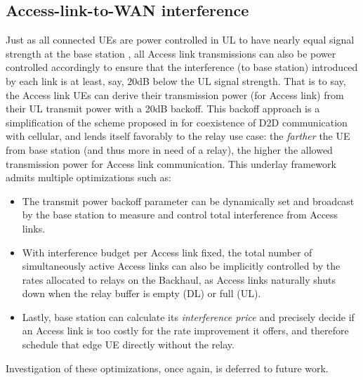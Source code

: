 \documentclass[journal]{IEEEtran}
\begin{document}



\subsection{Access-link-to-WAN interference}
Just as all connected UEs are power controlled in UL to have nearly equal signal strength at the base station \cite[pp.~464-471]{SesTouBak09}, all Access link transmissions can also be power controlled accordingly to ensure that the interference (to base station) introduced by each link is at least, say, $20$dB below the UL signal strength.   That is to say, the Access link UEs can derive their transmission power (for Access link) from their UL transmit power with a 20dB backoff.  This backoff approach is a simplification of the scheme proposed in \cite{JanisYuDoppler09} for coexistence of D2D communication with cellular, and lends itself favorably to the relay use case: the {\em farther} the UE from base station (and thus more in need of a relay), the higher the allowed transmission power for Access link communication.  This underlay framework admits multiple optimizations such as:
\begin{itemize}
    \item The transmit power backoff parameter can be dynamically set and broadcast by the base station to measure and control total interference from Access links.
    \item With interference budget per Access link fixed, the total number of simultaneously active Access links can also be implicitly controlled by the rates allocated to relays on the Backhaul, as Access links naturally shuts down when the relay buffer is empty (DL) or full (UL).
    \item Lastly, base station can calculate its {\em interference price} and precisely decide if an Access link is too costly for the rate improvement it offers, and therefore schedule that edge UE directly without the relay.
\end{itemize}
Investigation of these optimizations, once again, is deferred to future work.
\end{document}
